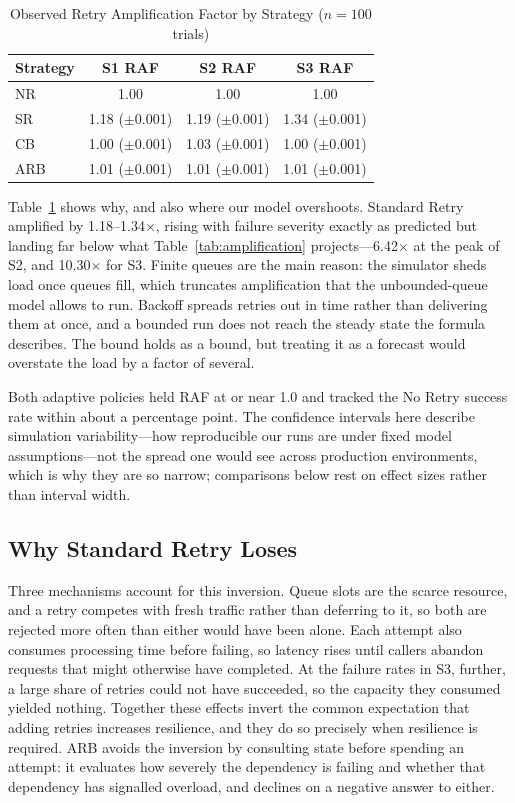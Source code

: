 \documentclass[conference]{IEEEtran}
\begin{document}
\begin{table}[htbp]
\caption{Observed Retry Amplification Factor by Strategy ($n=100$ trials)}
\label{tab:raf_observed}
\centering
\begin{tabular}{lccc}
\toprule
\textbf{Strategy} & \textbf{S1 RAF} & \textbf{S2 RAF} & \textbf{S3 RAF} \\
\midrule
NR & 1.00 & 1.00 & 1.00 \\
SR & 1.18 ($\pm$0.001) & 1.19 ($\pm$0.001) & 1.34 ($\pm$0.001) \\
CB & 1.00 ($\pm$0.001) & 1.03 ($\pm$0.001) & 1.00 ($\pm$0.001) \\
ARB & 1.01 ($\pm$0.001) & 1.01 ($\pm$0.001) & 1.01 ($\pm$0.001) \\
\bottomrule
\end{tabular}
\end{table}

Table~\ref{tab:raf_observed} shows why, and also where our model overshoots. Standard Retry amplified by 1.18--1.34$\times$, rising with failure severity exactly as predicted but landing far below what Table~\ref{tab:amplification} projects---6.42$\times$ at the peak of S2, and 10.30$\times$ for S3. Finite queues are the main reason: the simulator sheds load once queues fill, which truncates amplification that the unbounded-queue model allows to run. Backoff spreads retries out in time rather than delivering them at once, and a bounded run does not reach the steady state the formula describes. The bound holds as a bound, but treating it as a forecast would overstate the load by a factor of several.

Both adaptive policies held RAF at or near 1.0 and tracked the No Retry success rate within about a percentage point. The confidence intervals here describe simulation variability---how reproducible our runs are under fixed model assumptions---not the spread one would see across production environments, which is why they are so narrow; comparisons below rest on effect sizes rather than interval width.

\subsection{Why Standard Retry Loses}

Three mechanisms account for this inversion. Queue slots are the scarce resource, and a retry competes with fresh traffic rather than deferring to it, so both are rejected more often than either would have been alone. Each attempt also consumes processing time before failing, so latency rises until callers abandon requests that might otherwise have completed. At the failure rates in S3, further, a large share of retries could not have succeeded, so the capacity they consumed yielded nothing. Together these effects invert the common expectation that adding retries increases resilience, and they do so precisely when resilience is required. ARB avoids the inversion by consulting state before spending an attempt: it evaluates how severely the dependency is failing and whether that dependency has signalled overload, and declines on a negative answer to either.
\end{document}
